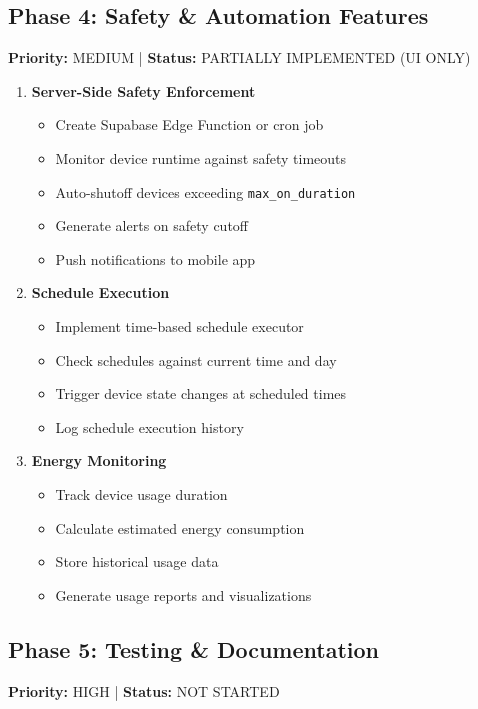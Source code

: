 \documentclass[12pt,a4paper]{article}
\begin{document}
\subsection{Phase 4: Safety \& Automation Features}
\textbf{Priority:} MEDIUM | \textbf{Status:} \textcolor{pending}{PARTIALLY IMPLEMENTED (UI ONLY)}

\begin{enumerate}[leftmargin=*]
    \item \textbf{Server-Side Safety Enforcement}
    \begin{itemize}
        \item Create Supabase Edge Function or cron job
        \item Monitor device runtime against safety timeouts
        \item Auto-shutoff devices exceeding \texttt{max\_on\_duration}
        \item Generate alerts on safety cutoff
        \item Push notifications to mobile app
    \end{itemize}
    
    \item \textbf{Schedule Execution}
    \begin{itemize}
        \item Implement time-based schedule executor
        \item Check schedules against current time and day
        \item Trigger device state changes at scheduled times
        \item Log schedule execution history
    \end{itemize}
    
    \item \textbf{Energy Monitoring}
    \begin{itemize}
        \item Track device usage duration
        \item Calculate estimated energy consumption
        \item Store historical usage data
        \item Generate usage reports and visualizations
    \end{itemize}
\end{enumerate}

\subsection{Phase 5: Testing \& Documentation}
\textbf{Priority:} HIGH | \textbf{Status:} \textcolor{required}{NOT STARTED}
\end{document}
